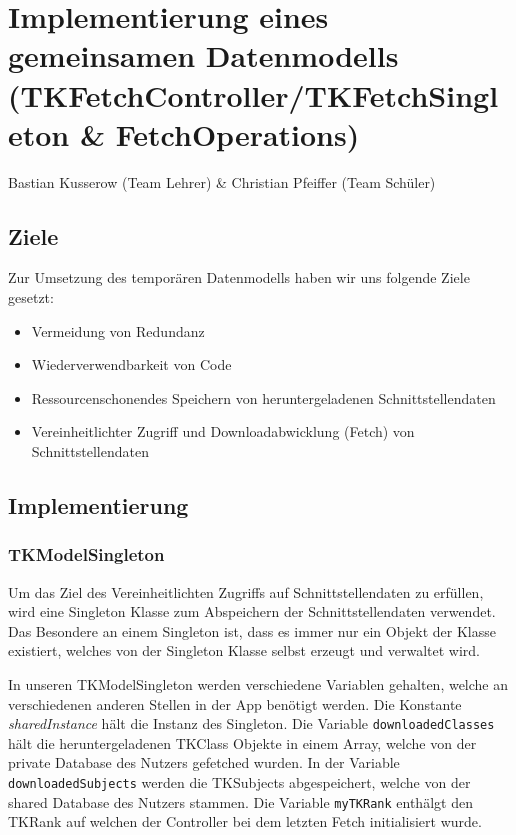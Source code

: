 \chapter{Implementierung eines gemeinsamen Datenmodells (TKFetchController/TKFetchSingleton \& FetchOperations)}
Bastian Kusserow (Team Lehrer) \& Christian Pfeiffer (Team Schüler)
\section{Ziele}
Zur Umsetzung des temporären Datenmodells haben wir uns folgende Ziele gesetzt:

\begin{itemize}
\item Vermeidung von Redundanz
\item Wiederverwendbarkeit von Code
\item Ressourcenschonendes Speichern von heruntergeladenen Schnittstellendaten
\item Vereinheitlichter Zugriff und Downloadabwicklung (Fetch) von Schnittstellendaten
\end{itemize}

\section{Implementierung}

\subsection{TKModelSingleton}
Um das Ziel des Vereinheitlichten Zugriffs auf Schnittstellendaten zu erfüllen, wird eine Singleton Klasse zum Abspeichern der Schnittstellendaten verwendet.
Das Besondere an einem Singleton ist, dass es immer nur ein Objekt der Klasse existiert, welches von der Singleton Klasse selbst erzeugt und verwaltet wird. 



In unseren TKModelSingleton werden verschiedene Variablen gehalten, welche an verschiedenen anderen Stellen in der App benötigt werden. Die Konstante \textit{sharedInstance} hält die Instanz des Singleton. Die Variable \texttt{downloadedClasses} hält die heruntergeladenen TKClass Objekte in einem Array, welche von der private Database des Nutzers gefetched wurden. In der Variable \texttt{downloadedSubjects} werden die TKSubjects abgespeichert, welche von der shared Database des Nutzers stammen. Die Variable \texttt{myTKRank} enthälgt den TKRank auf welchen der Controller bei dem letzten Fetch initialisiert wurde.


